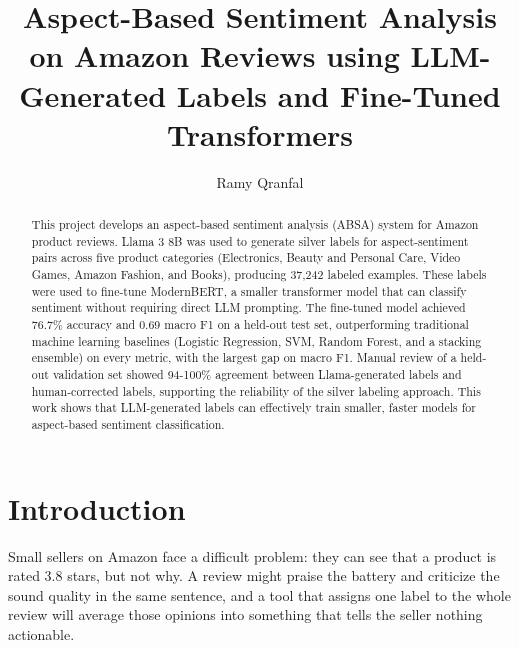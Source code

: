 \documentclass[sigconf]{acmart}
\begin{document}
\title[ABSA on Amazon Reviews]{Aspect-Based Sentiment Analysis on Amazon Reviews using LLM-Generated Labels and Fine-Tuned Transformers}

\author{Ramy Qranfal}

\renewcommand{\shortauthors}{Qranfal}


\begin{abstract}
This project develops an aspect-based sentiment analysis (ABSA) system for 
Amazon product reviews. Llama 3 8B was used to generate silver labels for 
aspect-sentiment pairs across five product categories (Electronics, Beauty 
and Personal Care, Video Games, Amazon Fashion, and Books), producing 37,242 
labeled examples. These labels were used to fine-tune ModernBERT, a smaller 
transformer model that can classify sentiment without requiring direct LLM 
prompting. The fine-tuned model achieved 76.7\% accuracy and 0.69 macro F1 
on a held-out test set, outperforming traditional machine learning baselines (Logistic Regression, SVM, Random Forest, and a stacking ensemble) on every metric, with the largest gap on macro F1. Manual review of a held-out validation set showed 94-100\% 
agreement between Llama-generated labels and human-corrected labels, 
supporting the reliability of the silver labeling approach. This work shows 
that LLM-generated labels can effectively train smaller, faster models for 
aspect-based sentiment classification.
\end{abstract}



\maketitle

\section{Introduction}
Small sellers on Amazon face a difficult problem: they can see that a product is rated 3.8 stars, but not why. A review might praise the battery and criticize the sound quality in the same sentence, and a tool that assigns one label to the whole review will average those opinions into something that tells the seller nothing actionable.
\end{document}
